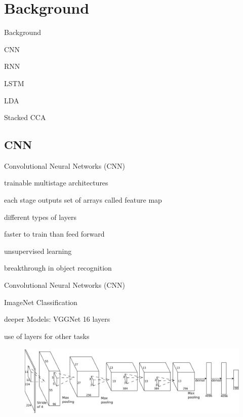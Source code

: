 \documentclass[16pt]{beamer}
\newenvironment{wideitemize}{\itemize\addtolength{\itemsep}{10pt}}{\enditemize}
\begin{document}
\section{Background} 
\begin{frame}{Background}
\begin{wideitemize}
\item CNN
\item RNN
\item LSTM
\item LDA
\item Stacked CCA
\end{wideitemize}
\end{frame}

\subsection{CNN}%
\begin{frame}{Convolutional Neural Networks (CNN)}
\begin{wideitemize}
\item trainable multistage architectures
\item each stage outputs set of arrays called feature map
\item different types of layers
\item faster to train than feed forward
\item unsupervised learning
\item breakthrough in object recognition

\end{wideitemize}
\end{frame}

\begin{frame}{Convolutional Neural Networks (CNN)}
\begin{wideitemize}
\item ImageNet Classification 
\item deeper Models: VGGNet 16 layers \cite{Arge2015}
\item use of layers for other tasks
\begin{figure}[tb]
           \centering
           \includegraphics[width=\linewidth]{cnn.PNG}
\\\cite{Krizhevsky2012a}
           \end{figure}

\end{wideitemize}
\end{frame}
\end{document}
